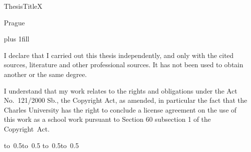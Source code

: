 
\pagestyle{empty}
\hypersetup{pageanchor=false}
\begin{center}
    \def\ThesisTitleXmff{%
        \centerline{\mbox{\texttt{[image: img/logo-en.pdf]}}}
        \vspace{-8mm}
        \vfill
        {\bf\Large\ThesisTypeTitle}
        \vfill
        {\LARGE\ThesisAuthor}
        \par
        \vspace{15mm}
        {\LARGE\bfseries\ThesisTitle}
        \vfill
        \Department
    }

    \csname ThesisTitleX\ThesisTitleStyle\endcsname

    \vfill

    {
        \centerline{
            \vbox{
            }
        }
    }

    \vfill

    Prague
    \YearSubmitted
\end{center}


\newpage
\openright
\hypersetup{pageanchor=true}
\pagestyle{plain}
\vglue 0pt plus 1fill

\noindent
I declare that I carried out this \ThesisType thesis independently, and only with the cited
sources, literature and other professional sources. It has not been used to obtain another
or the same degree.

\medskip
\noindent
I understand that my work relates to the rights and obligations under the Act No.~121/2000 Sb.,
the Copyright Act, as amended, in particular the fact that the Charles University has the right
to conclude a license agreement on the use of this work as a school work pursuant to Section 60
subsection 1 of the Copyright~Act.

\vspace{10mm}
\hbox{\hbox to 0.5\hbox to 0.5\hsize{\dotfill\quad}}
\smallskip
\hbox{\hbox to 0.5\hsize{}\hbox to 0.5}
\vspace{20mm}


